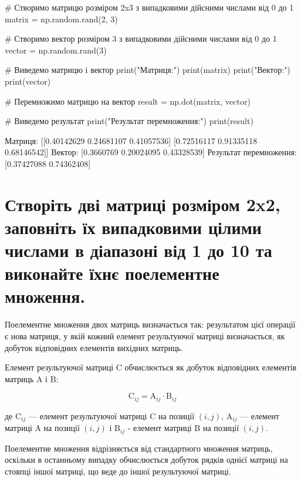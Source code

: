 \documentclass[]{article}
\newcounter{pythoncode}
\begin{document}
\begin{pythoncode}
    # Створимо матрицю розміром 2x3 з випадковими дійсними числами від 0 до 1
    matrix = np.random.rand(2, 3)

    # Створимо вектор розміром 3 з випадковими дійсними числами від 0 до 1
    vector = np.random.rand(3)

    # Виведемо матрицю і вектор
    print("Матриця:")
    print(matrix)
    print("Вектор:")
    print(vector)

    # Перемножимо матрицю на вектор
    result = np.dot(matrix, vector)

    # Виведемо результат
    print("Результат перемноження:")
    print(result)
\end{pythoncode}

\begin{out}
    Матриця:
    [[0.40142629 0.24681107 0.41057536]
     [0.72516117 0.91335118 0.68146542]]
    Вектор:
    [0.3660769  0.20024095 0.43328539]
    Результат перемноження:
    [0.37427088 0.74362408]
\end{out}

\section{Створіть дві матриці розміром 2x2, заповніть їх 	випадковими цілими числами в діапазоні від 1 до 10 та виконайте їхнє 	поелементне 	множення.}

Поелементне множення двох матриць визначається так: результатом цієї
операції є нова матриця, у якій кожний елемент результуючої матриці
визначається, як добуток відповідних елементів вихідних матриць.

Елемент результуючої матриці \(\mathrm C\) обчислюється як добуток
відповідних елементів матриць \(\mathrm A\) і \(\mathrm B\):

\[
	\mathrm C_{ij}  = \mathrm A_{ij} \cdot \mathrm B_{ij}
\]

де \(\mathrm C_{ij}\) --- елемент результуючої матриці \(\mathrm C\) на
позиції \((i, j)\), \(\mathrm A_{ij}\) --- елемент матриці \(\mathrm A\)
на позиції \((i, j)\) і \(\mathrm B_{ij}\) - елемент матриці
\(\mathrm B\) на позиції \((i, j)\).

Поелементне множення відрізняється від стандартного множення матриць,
оскільки в останньому випадку обчислюється добуток рядків однієї матриці
на стовпці іншої матриці, що веде до іншої результуючої матриці.
\end{document}

